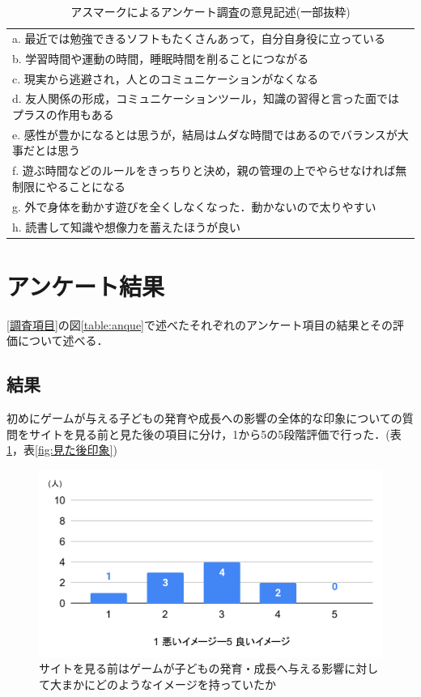 \documentclass[12pt,a4j,titlepage]{ltjsarticle}
\begin{document}
\begin{table}[H]
 \caption{アスマークによるアンケート調査の意見記述(一部抜粋)}
 \label{table:asmarqanque}
 \small
 \centering
  \begin{tabular}{l}
  \hline
   a. 最近では勉強できるソフトもたくさんあって，自分自身役に立っている\\
   b. 学習時間や運動の時間，睡眠時間を削ることにつながる \\
   c. 現実から逃避され，人とのコミュニケーションがなくなる \\
   d. 友人関係の形成，コミュニケーションツール，知識の習得と言った面ではプラスの作用もある \\
   e. 感性が豊かになるとは思うが，結局はムダな時間ではあるのでバランスが大事だとは思う \\
   f. 遊ぶ時間などのルールをきっちりと決め，親の管理の上でやらせなければ無制限にやることになる\\
   g. 外で身体を動かす遊びを全くしなくなった．動かないので太りやすい \\
   h. 読書して知識や想像力を蓄えたほうが良い \\
   \hline
  \end{tabular}
\end{table}

\clearpage
\section{アンケート結果}
\ref{調査項目}の図\ref{table:anque}で述べたそれぞれのアンケート項目の結果とその評価について述べる．

\subsection{結果}
初めにゲームが与える子どもの発育や成長への影響の全体的な印象についての質問をサイトを見る前と見た後の項目に分け，1から5の5段階評価で行った．(表\ref{fig:見る前印象}，表\ref{fig:見た後印象})


\begin{figure}[H]
 \begin{center}
  \includegraphics[keepaspectratio, scale=0.5]{印象前.pdf}
 \end{center}
 \caption{サイトを見る前はゲームが子どもの発育・成長へ与える影響に対して大まかにどのようなイメージを持っていたか}
 \label{fig:見る前印象}
\end{figure}
\end{document}
